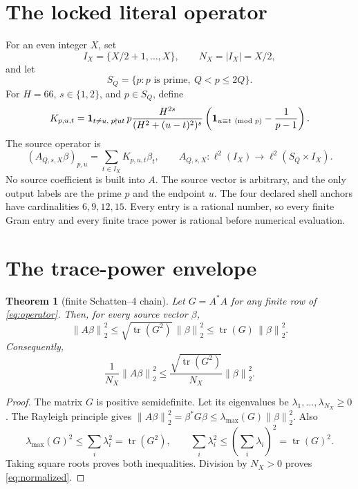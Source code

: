 \documentclass[10pt,a4paper]{article}
\newtheorem{theorem}{Theorem}
\newcommand{\norm}[1]{\left\lVert #1\right\rVert}
\newcommand{\tr}{\operatorname{tr}}
\begin{document}
\section{The locked literal operator}

For an even integer $X$, set
\[
 I_X=\{X/2+1,\ldots,X\},\qquad N_X=|I_X|=X/2,
\]
and let
\[
 S_Q=\{p:p\text{ is prime},\ Q<p\leq 2Q\}.
\]
For $H=66$, $s\in\{1,2\}$, and $p\in S_Q$, define
\begin{equation}
 K_{p,u,t}=
 {\bf 1}_{t\ne u,\;p\nmid ut}\,p
 \frac{H^{2s}}{(H^2+(u-t)^2)^s}
 \left({\bf 1}_{u\equiv t\pmod p}-\frac1{p-1}\right).
 \label{eq:entry}
\end{equation}
The source operator is
\begin{equation}
 (A_{Q,s,X}\beta)_{p,u}=\sum_{t\in I_X}K_{p,u,t}\beta_t,
 \qquad
 A_{Q,s,X}:\ell^2(I_X)\longrightarrow
 \ell^2(S_Q\times I_X).
 \label{eq:operator}
\end{equation}
No source coefficient is built into $A$.  The source vector is arbitrary, and
the only output labels are the prime $p$ and the endpoint $u$.  The four
declared shell anchors have cardinalities $6,9,12,15$.  Every entry is a
rational number, so every finite Gram entry and every finite trace power is
rational before numerical evaluation.

\section{The trace-power envelope}

\begin{theorem}[finite Schatten--4 chain]
Let $G=A^*A$ for any finite row of \eqref{eq:operator}.  Then, for every
source vector $\beta$,
\begin{equation}
 \norm{A\beta}_2^2
 \leq \sqrt{\tr(G^2)}\,\norm{\beta}_2^2
 \leq \tr(G)\,\norm{\beta}_2^2.
 \label{eq:chain}
\end{equation}
Consequently,
\begin{equation}
 \frac1{N_X}\norm{A\beta}_2^2
 \leq \frac{\sqrt{\tr(G^2)}}{N_X}\norm{\beta}_2^2.
 \label{eq:normalized}
\end{equation}
\end{theorem}

\begin{proof}
The matrix $G$ is positive semidefinite.  Let its eigenvalues be
$\lambda_1,\ldots,\lambda_{N_X}\geq0$.  The Rayleigh principle gives
\(\norm{A\beta}_2^2=\beta^*G\beta\leq
\lambda_{\max}(G)\norm{\beta}_2^2\).  Also
\[
 \lambda_{\max}(G)^2\leq\sum_i\lambda_i^2=\tr(G^2),
 \qquad
 \sum_i\lambda_i^2\leq\left(\sum_i\lambda_i\right)^2=\tr(G)^2.
\]
Taking square roots proves both inequalities.  Division by $N_X>0$ proves
\eqref{eq:normalized}.
\end{proof}
\end{document}
